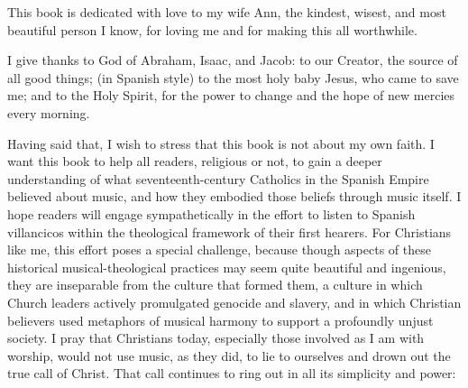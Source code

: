This book is dedicated with love to my wife Ann, the kindest, wisest, and most
beautiful person I know, for loving me and for making this all worthwhile.

I give thanks to God of Abraham, Isaac, and Jacob: 
to our Creator, the source of all good things; 
(in Spanish style) to the most holy baby Jesus, who came to save me; 
and to the Holy Spirit, for the power to change and the hope of new mercies
every morning.  

Having said that, I wish to stress that this book is not about my own faith.
I want this book to help all readers, religious or not, to gain a deeper
understanding of what seventeenth-century Catholics in the Spanish Empire
believed about music, and how they embodied those beliefs through music
itself.
I hope readers will engage sympathetically in the effort to listen to Spanish
villancicos within the theological framework of their first hearers.
For Christians like me, this effort poses a special challenge, because though
aspects of these historical musical-theological practices may seem quite
beautiful and ingenious, they are inseparable from the culture that formed
them, a culture in which Church leaders actively promulgated genocide and
slavery, and in which Christian believers used metaphors of musical harmony to
support a profoundly unjust society.
I pray that Christians today, especially those involved as I am with worship,
would not use music, as they did, to lie to ourselves and drown out the true
call of Christ.
That call continues to ring out in all its simplicity and power: 


\endinput
